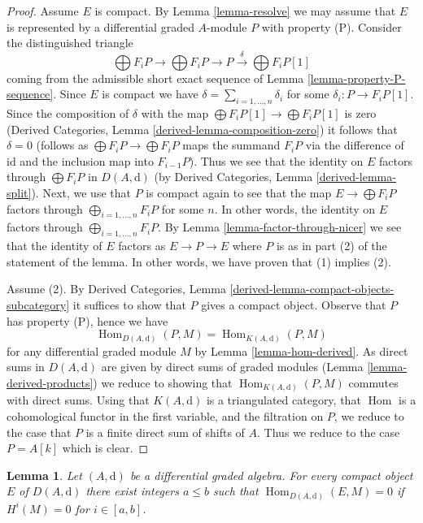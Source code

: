 \documentclass{stacks-project}
\theoremstyle{plain}
\newtheorem{lemma}[subsection]{Lemma}
\theoremstyle{definition}
\theoremstyle{remark}
\numberwithin{equation}{subsection}
\def\Hom{\mathop{\mathrm{Hom}}\nolimits}
\begin{document}
\begin{proof}
Assume $E$ is compact. By Lemma \ref{lemma-resolve} we may assume that $E$
is represented by a differential graded $A$-module $P$ with property (P).
Consider the distinguished triangle
$$
\bigoplus F_iP \to \bigoplus F_iP \to P
\xrightarrow{\delta} \bigoplus F_iP[1]
$$
coming from the admissible short exact sequence of
Lemma \ref{lemma-property-P-sequence}. Since $E$ is compact we have
$\delta = \sum_{i = 1, \ldots, n} \delta_i$ for some
$\delta_i : P \to F_iP[1]$. Since the composition of $\delta$
with the map $\bigoplus F_iP[1] \to \bigoplus F_iP[1]$ is zero
(Derived Categories, Lemma \ref{derived-lemma-composition-zero})
it follows that $\delta = 0$ (follows as $\bigoplus F_iP \to \bigoplus F_iP$
maps the summand $F_iP$ via the difference of $\text{id}$ and the inclusion
map into $F_{i - 1}P$).
Thus we see that the identity on $E$ factors through
$\bigoplus F_iP$ in $D(A, \text{d})$ (by
Derived Categories, Lemma \ref{derived-lemma-split}).
Next, we use that $P$ is compact again to see that the map
$E \to \bigoplus F_iP$ factors through $\bigoplus_{i = 1, \ldots, n} F_iP$
for some $n$. In other words, the identity on $E$ factors through
$\bigoplus_{i = 1, \ldots, n} F_iP$. By
Lemma \ref{lemma-factor-through-nicer}
we see that the identity of $E$ factors as $E \to P \to E$
where $P$ is as in part (2) of the statement of the lemma.
In other words, we have proven that (1) implies (2).

\medskip\noindent
Assume (2). By
Derived Categories, Lemma \ref{derived-lemma-compact-objects-subcategory}
it suffices to show that $P$ gives a compact object. Observe that
$P$ has property (P), hence we have
$$
\Hom_{D(A, \text{d})}(P, M) = \Hom_{K(A, \text{d})}(P, M)
$$
for any differential graded module $M$ by Lemma \ref{lemma-hom-derived}.
As direct sums in $D(A, \text{d})$ are given by direct sums of
graded modules (Lemma \ref{lemma-derived-products}) we reduce
to showing that $\Hom_{K(A, \text{d})}(P, M)$ commutes with direct
sums. Using that $K(A, \text{d})$ is a triangulated category,
that $\Hom$ is a cohomological functor in the first
variable, and the filtration on $P$, we reduce to the case that
$P$ is a finite direct sum of shifts of $A$. Thus we reduce to
the case $P = A[k]$ which is clear.
\end{proof}

\begin{lemma}
\label{lemma-compact-implies-bounded}
Let $(A, \text{d})$ be a differential graded algebra.
For every compact object $E$ of $D(A, \text{d})$ there
exist integers $a \leq b$ such that $\Hom_{D(A, \text{d})}(E, M) = 0$
if $H^i(M) = 0$ for $i \in [a, b]$.
\end{lemma}
\end{document}

